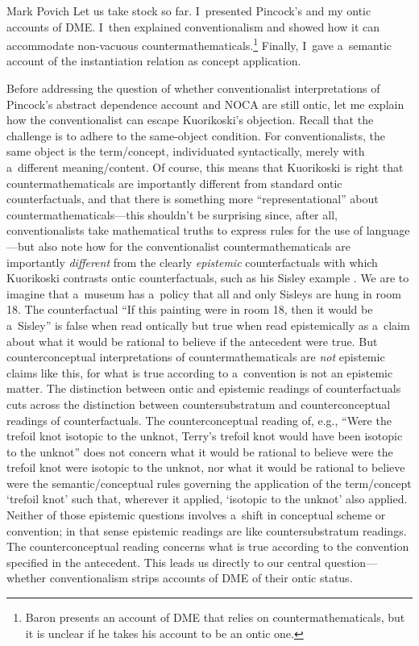 \begin{artengenv}{Mark Povich}
Let us take stock so far. I~presented Pincock's
\parencite*[][]{pincock_abstract_2015} %
 and my 
\parencite[][]{povich_narrow_2021} %
 ontic accounts of DME. I~then explained conventionalism and showed how it can accommodate non-vacuous countermathematicals.\footnote{Baron 
\parencite*[][]{baron_counterfactual_2020} %
 presents an account of DME that relies on countermathematicals, but it is unclear if he takes his account to be an ontic one. } Finally, I~gave a~semantic account of the instantiation relation as concept application.

Before addressing the question of whether conventionalist interpretations of Pincock's abstract dependence account and NOCA are still ontic, let me explain how the conventionalist can escape Kuorikoski's objection. Recall that the challenge is to adhere to the same-object condition. For conventionalists, the same object is the term/concept, individuated syntactically, merely with a~different meaning/content. Of course, this means that Kuorikoski is right that countermathematicals are importantly different from standard ontic counterfactuals, and that there is something more ``representational'' about countermathematicals---this shouldn't be surprising since, after all, conventionalists take mathematical truths to express rules for the use of language---but also note how for the conventionalist countermathematicals are importantly \textit{different} from the clearly \textit{epistemic} counterfactuals with which Kuorikoski contrasts ontic counterfactuals, such as his Sisley example
\parencite[][p.196]{kuorikoski_there_2021}. %
 We are to imagine that a~museum has a~policy that all and only Sisleys are hung in room 18. The counterfactual ``If this painting were in room 18, then it would be a~Sisley'' is false when read ontically but true when read epistemically as a~claim about what it would be rational to believe if the antecedent were true. But counterconceptual interpretations of countermathematicals are \textit{not} epistemic claims like this, for what is true according to a~convention is not an epistemic matter. The distinction between ontic and epistemic readings of counterfactuals cuts across the distinction between countersubstratum and counterconceptual readings of counterfactuals. The counterconceptual reading of, e.g., ``Were the trefoil knot isotopic to the unknot, Terry's trefoil knot would have been isotopic to the unknot'' does not concern what it would be rational to believe were the trefoil knot were isotopic to the unknot, nor what it would be rational to believe were the semantic/conceptual rules governing the application of the term/concept ‘trefoil knot' such that, wherever it applied, ‘isotopic to the unknot' also applied. Neither of those epistemic questions involves a~shift in conceptual scheme or convention; in that sense epistemic readings are like countersubstratum readings. The counterconceptual reading concerns what is true according to the convention specified in the antecedent. This leads us directly to our central question---whether conventionalism strips accounts of DME of their ontic status.


\end{artengenv}
